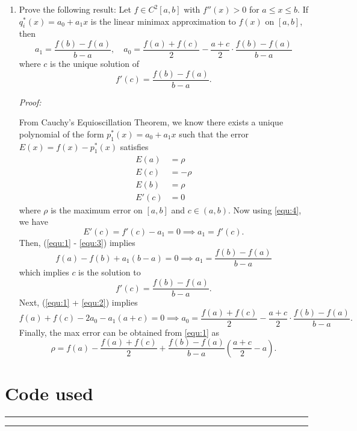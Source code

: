 \documentclass[a4paper,12pt]{article}
\newenvironment{proof}[2][$\square$]
    {\setlength{\parskip}{0pt}\par\textit{Proof:} #2\setlength{\parskip}{0.25cm}
        \savebox{\qed}{#1}
        \begin{adjustwidth}{\widthof{Proof:}}{}
    }
    {
        \hfill\usebox{\qed}\end{adjustwidth}
    }
\begin{document}
\begin{enumerate}[label = \arabic*.]
	\item Prove the following result: Let $ f \in C^2 [a,b] $ with $ f''(x) > 0 $ for $ a \leq x \leq b $. If $ q_i^*(x) = a_0 + a_1 x $ is the linear minimax approximation to $ f(x) $ on $ [a,b] $, then 
	\[
		a_1 = \frac{f(b) - f(a)}{b - a}, \quad a_0 = \frac{f(a) + f(c)}{2} - \frac{a + c}{2} \cdot \frac{f(b) - f(a)}{b - a}
	\]
	where $ c $ is the unique solution of
	\[
		f'(c) = \frac{f(b) - f(a)}{b - a}.
	\]
	
	\begin{proof}{}
		From Cauchy's Equioscillation Theorem, we know there exists a unique polynomial of the form $ p_1^*(x) = a_0+ a_1 x $ such that the error $ E(x) = f(x) - p_1^*(x) $ satisfies
		\begin{align}
			E(a) &= \rho \label{equ:1} \\
			E(c) &= -\rho \label{equ:2} \\ 
			E(b) &= \rho \label{equ:3} \\
			E'(c) &= 0 \label{equ:4}
		\end{align}
		where $ \rho $ is the maximum error on $ [a, b] $ and $ c \in (a,b) $. Now using \eqref{equ:4}, we have
		\[
			E'(c) = f'(c) - a_1 = 0 \implies a_1 = f'(c).
		\]
		Then, (\eqref{equ:1} - \eqref{equ:3}) implies
		\[
			f(a) - f(b) + a_1(b - a) = 0 \implies \boxed{a_1 = \frac{f(b) - f(a)}{b - a}}
		\]
		which implies $ c $ is the solution to 
		\[
			\boxed{f'(c) = \frac{f(b) - f(a)}{b - a}}.
		\]
		Next, (\eqref{equ:1} + \eqref{equ:2}) implies
		\[
			f(a) + f(c) - 2a_0 - a_1 (a + c) = 0 \implies \boxed{a_0 = \frac{f(a) + f(c)}{2} - \frac{a + c}{2} \cdot \frac{f(b) - f(a)}{b - a}}.
		\]
		Finally, the max error can be obtained from \eqref{equ:1} as
		\[
			\boxed{\rho = f(a) - \frac{f(a) + f(c)}{2} + \frac{f(b) - f(a)}{b - a} \left(\frac{a + c}{2} -  a\right)}.
		\]
	\end{proof}
\end{enumerate}

\section*{Code used}
\rule{\textwidth}{4pt}
	
\rule{\textwidth}{4pt}
\end{document}
